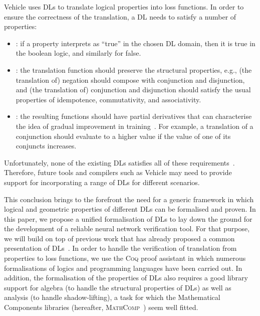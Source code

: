 \documentclass[a4paper,UKenglish,cleveref, autoref, thm-restate]{lipics-v2021}
\def\coq{\textsc{Coq}}
\def\mathcomp{\textsc{MathComp}}
\begin{document}
Vehicle uses DLs to translate logical properties into loss functions. In order to 
ensure the correctness of the translation, a DL needs to satisfy a number of properties:
\begin{itemize}
\item {}: if a property interprets as ``true'' in the
  chosen DL domain, then it is true in the boolean logic, and
  similarly for false.
\item {}: the translation function should 
  preserve the structural properties, e.g.,
  (the translation of) negation should compose with conjunction and
  disjunction, and (the translation of) conjunction and disjunction
  should satisfy the usual properties of idempotence, commutativity,
  and associativity.
\item {}: the resulting functions should have
  partial derivatives that can characterise the idea of gradual
  improvement in training~\cite{varnai}. For example, a translation of
  a conjunction should evaluate to a higher value if the value of one
  of its conjuncts increases.
\end{itemize}

Unfortunately, none of the existing DLs satisfies all of these
requirements~\cite{ldl,varnai}.
%
Therefore, future tools and compilers such as Vehicle may need to
provide support for incorporating a range of DLs for different
scenarios.  

This conclusion brings to the forefront the need for a generic
framework in which logical and geometric properties of different DLs
can be formalised and proven.
%
In this paper, we propose a unified formalisation of DLs to lay down
the ground for the development of a reliable neural network verification tool.
%
For that purpose, we will build on top of previous work that has already proposed
a common presentation of DLs~\cite{ldl}.
%
In order to handle the verification of translation from properties to
loss functions, we use the \coq{} proof assistant in which numerous
formalisations of logics and programming languages have been carried
out.
%
In addition, the formalisation of the properties of DLs also requires a
good library support for algebra (to handle the structural properties
of DLs) as well as analysis (to handle shadow-lifting), a
task for which the Mathematical Components libraries (hereafter, \mathcomp{}~\cite{mathcomp}) seem well fitted.
\end{document}

